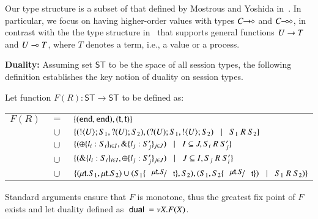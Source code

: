 Our type structure is a subset of that defined by Mostrous and Yoshida in~\cite{tlca07}.
In particular, we focus on having higher-order values with types
$C\!\! \rightarrow\!\! \diamond$ and $C\!\! \multimap\!\! \diamond$, in contrast with the the type structure
in~\cite{tlca07} that supports general functions
$U \rightarrow T$ and 
$U \multimap T$, where $T$ denotes a term, i.e., a value or a process.


{\bf Duality: }
Assuming set $\mathsf{ST}$ to be the space of all session types,
the following definition establishes the key notion of duality on session types.
%
\begin{definition}[Duality]\rm
	Let function $F(R): \mathsf{ST} \longrightarrow \mathsf{ST}$ to be defined as:

	\begin{tabular}{rcl}
		$F(R)$ &$=$&		$\{(\mathtt{end}, \mathtt{end}), (\mathsf{t}, \mathsf{t})\}$\\
			&$\cup$&	$\set{(\btout{U} S_1, \btinp{U} S_2), (\btinp{U} S_1, \btout{U} S_2) \bnfbar S_1\ R\ S_2}$\\
			&$\cup$&	$\{(\oplus \{l_i: S_i\}_{i \in I}, \& \{l_j: S_j'\}_{j \in J}) \;\;\;|\;\;\; I \subseteq J, S_i\ R\ S_j'\}$\\
			&$\cup$&	$\{(\& \{l_i: S_i\}_{i \in I}, \oplus \{l_j: S_j'\}_{j \in J}) \;\;\;|\;\;\; J \subseteq I, S_j\ R\ S_i'\}$\\
			&$\cup$&	$\set{(\trec{t}{S_1}, \trec{t}{S_2}) \cup (S_1 \subst{\trec{t}{S}}{\vart{t}}, S_2), (S_1, S_2\subst{\trec{t}{S}}{\vart{t}}) \bnfbar S_1\ R\ S_2)}$
	\end{tabular}
	
\noindent
	Standard arguments ensure that $F$ is monotone, thus the greatest fix point
	of $F$ exists and let duality defined as $\ \mathsf{dual}\  = \nu X. F(X)$.
\end{definition}
%

